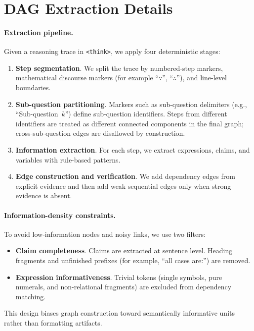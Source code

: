     \section{DAG Extraction Details}
    \label{app:dag}
    
    \paragraph{Extraction pipeline.}
    Given a reasoning trace in \texttt{<think>}, we apply four deterministic stages:
    \begin{enumerate}[leftmargin=*,itemsep=1pt]
        \item \textbf{Step segmentation}. We split the trace by numbered-step markers, mathematical discourse markers (for example ``$\because$'', ``$\therefore$''), and line-level boundaries.
        \item \textbf{Sub-question partitioning}. Markers such as sub-question delimiters (e.g., ``Sub-question~$k$'') define sub-question identifiers. Steps from different identifiers are treated as different connected components in the final graph; cross-sub-question edges are disallowed by construction.
        \item \textbf{Information extraction}. For each step, we extract expressions, claims, and variables with rule-based patterns.
        \item \textbf{Edge construction and verification}. We add dependency edges from explicit evidence and then add weak sequential edges only when strong evidence is absent.
    \end{enumerate}
    
    \paragraph{Information-density constraints.}
    To avoid low-information nodes and noisy links, we use two filters:
    \begin{itemize}[leftmargin=*,itemsep=1pt]
        \item \textbf{Claim completeness}. Claims are extracted at sentence level. Heading fragments and unfinished prefixes (for example, ``all cases are:'') are removed.
        \item \textbf{Expression informativeness}. Trivial tokens (single symbols, pure numerals, and non-relational fragments) are excluded from dependency matching.
    \end{itemize}
    This design biases graph construction toward semantically informative units rather than formatting artifacts.
    
